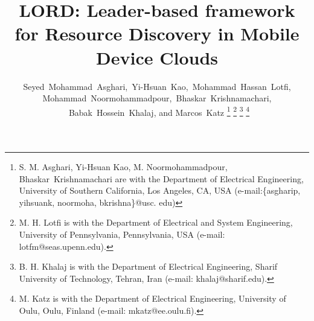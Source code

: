 \documentclass[journal,12pt, onecolumn]{IEEEtran}
\begin{document}
 
\title{LORD: Leader-based framework for Resource Discovery in Mobile Device Clouds
}


\author{Seyed~Mohammad~Asghari,~Yi-Hsuan~Kao,~Mohammad~Hassan~Lotfi, \\Mohammad~Noormohammadpour,~Bhaskar~Krishnamachari, \\
~Babak~Hossein~Khalaj, and Marcos~Katz
\thanks{
S. M. Asghari, Yi-Hsuan Kao, M. Noormohammadpour, Bhaskar~Krishnamachari are with the Department of Electrical Engineering, University of Southern California, Los Angeles, CA, USA
(e-mail:\{asgharip, yihsuank, noormoha, bkrishna\}@usc. edu)}
\thanks{
M. H. Lotfi is with the Department of Electrical and System Engineering, University of Pennsylvania, Pennsylvania, USA (e-mail: lotfm@seas.upenn.edu).}
\thanks{
B. H. Khalaj is with the Department of Electrical Engineering, Sharif University of Technology, Tehran, Iran (e-mail: khalaj@sharif.edu).}
\thanks{
M. Katz is with the Department of Electrical Engineering, University of Oulu, Oulu, Finland (e-mail: mkatz@ee.oulu.fi).
}}



























\maketitle
\end{document}
